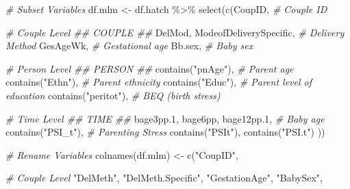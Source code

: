 \documentclass[
]{article}
\newenvironment{Shaded}{\begin{snugshade}}{\end{snugshade}}
\newcommand{\CommentTok}[1]{\textcolor[rgb]{0.56,0.35,0.01}{\textit{#1}}}
\newcommand{\FloatTok}[1]{\textcolor[rgb]{0.00,0.00,0.81}{#1}}
\newcommand{\FunctionTok}[1]{\textcolor[rgb]{0.00,0.00,0.00}{#1}}
\newcommand{\NormalTok}[1]{#1}
\newcommand{\OtherTok}[1]{\textcolor[rgb]{0.56,0.35,0.01}{#1}}
\newcommand{\SpecialCharTok}[1]{\textcolor[rgb]{0.00,0.00,0.00}{#1}}
\newcommand{\StringTok}[1]{\textcolor[rgb]{0.31,0.60,0.02}{#1}}
\begin{document}
\begin{Shaded}
\begin{Highlighting}[]
\CommentTok{\# Subset Variables}
\NormalTok{df.mlm }\OtherTok{\textless{}{-}}\NormalTok{ df.hatch }\SpecialCharTok{\%\textgreater{}\%}
  \FunctionTok{select}\NormalTok{(}\FunctionTok{c}\NormalTok{(CoupID,                                }\CommentTok{\# Couple ID}
           
           \CommentTok{\# Couple Level                         \#\# COUPLE \#\#}
\NormalTok{           DelMod, ModeofDeliverySpecific,        }\CommentTok{\# Delivery Method}
\NormalTok{           GesAgeWk,                              }\CommentTok{\# Gestational age}
\NormalTok{           Bb.sex,                                }\CommentTok{\# Baby sex}
           
           \CommentTok{\# Person Level                         \#\# PERSON \#\#}
           \FunctionTok{contains}\NormalTok{(}\StringTok{"pnAge"}\NormalTok{),                     }\CommentTok{\# Parent age}
           \FunctionTok{contains}\NormalTok{(}\StringTok{"Ethn"}\NormalTok{),                      }\CommentTok{\# Parent ethnicity}
           \FunctionTok{contains}\NormalTok{(}\StringTok{"Educ"}\NormalTok{),                      }\CommentTok{\# Parent level of education}
           \FunctionTok{contains}\NormalTok{(}\StringTok{"peritot"}\NormalTok{),                   }\CommentTok{\# BEQ (birth stress)}
           
           \CommentTok{\# Time Level                           \#\# TIME \#\#}
\NormalTok{           bage3pp}\FloatTok{.1}\NormalTok{, bage6pp, bage12pp}\FloatTok{.1}\NormalTok{,        }\CommentTok{\# Baby age}
           \FunctionTok{contains}\NormalTok{(}\StringTok{"PSI\_t"}\NormalTok{),                     }\CommentTok{\# Parenting Stress}
              \FunctionTok{contains}\NormalTok{(}\StringTok{"PSIt"}\NormalTok{),}
              \FunctionTok{contains}\NormalTok{(}\StringTok{"PSI.t"}\NormalTok{)}
\NormalTok{           ))   }

\CommentTok{\# Rename Variables}
\FunctionTok{colnames}\NormalTok{(df.mlm) }\OtherTok{\textless{}{-}} \FunctionTok{c}\NormalTok{(}\StringTok{"CoupID"}\NormalTok{,}
                      
                      \CommentTok{\# Couple Level}
                      \StringTok{"DelMeth"}\NormalTok{, }\StringTok{"DelMeth.Specific"}\NormalTok{,}
                      \StringTok{"GestationAge"}\NormalTok{,}
                      \StringTok{"BabySex"}\NormalTok{,}
                      

\end{Highlighting}
\end{Shaded}
\end{document}
